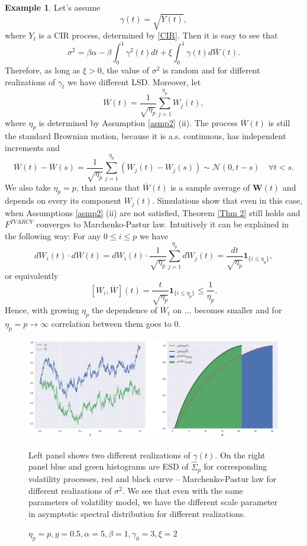 \documentclass[a4paper,11pt]{article}
\theoremstyle{plain}
\theoremstyle{definition}
\newtheorem{exmp}[thm]{Example}
\begin{document}
    \begin{exmp} \label{SimCIR}
    	Let's assume
    	\[ \gamma(t) = \sqrt{Y(t)}, \]
    	where $Y_t$ is a CIR process, determined by \eqref{CIR}. Then it is easy to see that
    	\[ \sigma^2 = \beta\alpha - \beta\int_{0}^{1} \gamma^2(t)dt + \xi \int_{0}^{1} \gamma(t) d\overline{W}(t).\]
    	Therefore, as long as $\xi > 0$, the value of $\sigma^2$ is random and for different realizations of $\gamma_t$ we have different LSD.
    	Moreover, let
    	\[ \overline{W}(t) = \frac{1}{\sqrt{\eta_p}} \sum_{j=1}^{\eta_p}W_j(t), \]
    	where $\eta_p$ is determined by Assumption \ref{asmp2} (ii). The process $\overline{W}(t)$ is still the standard Brownian motion, because it is a.s. continuous, has independent increments and
    	\[ \overline{W}(t) - \overline{W}(s) = \frac{1}{\sqrt{\eta_p}} \sum_{j=1}^{\eta_p}(W_j(t)-W_j(s)) \sim \mathcal{N}(0, t-s) \quad \forall t < s. \]
    	We also take $\eta_p = p$, that means that $\overline{W}(t)$ is a sample average of $\mathbf{W}(t)$ and depends on every its component $W_j(t)$. Simulations show that even in this case, when Assumptions \ref{asmp2} (ii) are not satisfied, Theorem \ref{Thm 2} still holds and $F^{TVARCV}$ converges to Marchenko-Pastur law. Intuitively it can be explained in the following way:
    	For any $0 \leq i \leq p$ we have
    	\[ dW_i(t) \cdot d\overline{W}(t) = dW_i(t) \cdot \frac{1}{\sqrt{\eta_p}} \sum_{j=1}^{\eta_p}dW_j(t) = \frac{dt}{\sqrt{\eta_p}} \mathbf{1}_{\{i \leq \eta_p\}}, \]
    	or equivalently 
    	\[ [W_i, \overline{W}](t) =  \frac{t}{\sqrt{\eta_p}} \mathbf{1}_{\{i \leq \eta_p\}} \leq \frac{1}{\eta_p} .  \]
    	Hence, with growing $\eta_p$ the dependence of $\overline{W}_t$ on ... becomes smaller and for $\eta_p = p \rightarrow \infty$ correlation between them goes to $0$.
    \end{exmp}
    
    \begin{figure}
    	\begin{center} \centering
    		\includegraphics[scale=0.4]{XCIR}
    		\caption{$\eta_p = p, y = 0.5, \alpha = 5, \beta = 1, \gamma_0 = 3, \xi = 2$}
    		\smallskip
    		\small
    		Left panel shows two different realizations of $\gamma(t)$. On the right panel blue and green histograms are ESD of $\widehat{\Sigma}_p$ for corresponding volatility processes, red and black curve -- Marchenko-Pastur law for different realizations of $\sigma^2$. We see that even with the same parameters of volatility model, we have the different scale parameter in asymptotic spectral distribution for different realizations.
    	\end{center}
    \end{figure}
    
\end{document}
